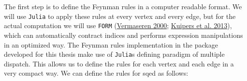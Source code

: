 \documentclass[
  11pt,
  a4paper,
  DIV=11,
  numbers=noendperiod,
  oneside]{scrreprt}
\newenvironment{Shaded}{\begin{snugshade}}{\end{snugshade}}
\newcommand{\DataTypeTok}[1]{\textcolor[rgb]{0.68,0.00,0.00}{#1}}
\newcommand{\FunctionTok}[1]{\textcolor[rgb]{0.28,0.35,0.67}{#1}}
\newcommand{\KeywordTok}[1]{\textcolor[rgb]{0.00,0.23,0.31}{#1}}
\newcommand{\NormalTok}[1]{\textcolor[rgb]{0.00,0.23,0.31}{#1}}
\newcommand{\OperatorTok}[1]{\textcolor[rgb]{0.37,0.37,0.37}{#1}}
\newcommand{\PreprocessorTok}[1]{\textcolor[rgb]{0.68,0.00,0.00}{#1}}
\newcommand{\SpecialCharTok}[1]{\textcolor[rgb]{0.37,0.37,0.37}{#1}}
\newcommand{\StringTok}[1]{\textcolor[rgb]{0.13,0.47,0.30}{#1}}
\DeclareRobustCommand{\[}{\begin{equation}}
\DeclareRobustCommand{\]}{\end{equation}}
\begin{document}
The first step is to define the Feynman rules in a computer readable
format. We will use \texttt{Julia} to apply these rules at every vertex
and every edge, but for the actual computation we will use \texttt{FORM}
(\protect\hyperlink{ref-Vermaseren:2000nd}{Vermaseren 2000};
\protect\hyperlink{ref-Kuipers:2012rf}{Kuipers et al. 2013}), which can
automatically contract indices and performs expression manipulations in
an optimized way. The Feynman rules implementation in the package
developed for this thesis make use of \texttt{Julia}s defining paradigm
of multiple dispatch. This allows us to define the rules for each vertex
and each edge in a very compact way. We can define the rules for
\gls{sqed} as follows:

\begin{Shaded}
\end{Shaded}
\end{document}
